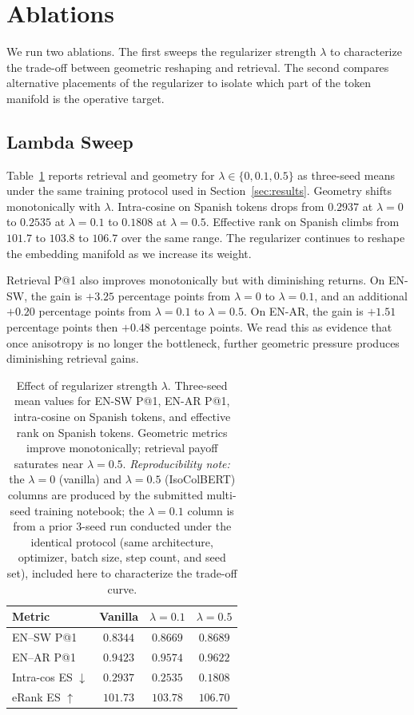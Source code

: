 \section{Ablations}
\label{sec:ablations}

We run two ablations. The first sweeps the regularizer strength $\lambda$ to characterize the trade-off between geometric reshaping and retrieval. The second compares alternative placements of the regularizer to isolate which part of the token manifold is the operative target.

\subsection{Lambda Sweep}
\label{sec:ablations-lambda}

Table~\ref{tab:lambda} reports retrieval and geometry for $\lambda \in \{0, 0.1, 0.5\}$ as three-seed means under the same training protocol used in Section~\ref{sec:results}. Geometry shifts monotonically with $\lambda$. Intra-cosine on Spanish tokens drops from $0.2937$ at $\lambda=0$ to $0.2535$ at $\lambda=0.1$ to $0.1808$ at $\lambda=0.5$. Effective rank on Spanish climbs from $101.7$ to $103.8$ to $106.7$ over the same range. The regularizer continues to reshape the embedding manifold as we increase its weight.

Retrieval P@1 also improves monotonically but with diminishing returns. On EN-SW, the gain is $+3.25$ percentage points from $\lambda=0$ to $\lambda=0.1$, and an additional $+0.20$ percentage points from $\lambda=0.1$ to $\lambda=0.5$. On EN-AR, the gain is $+1.51$ percentage points then $+0.48$ percentage points. We read this as evidence that once anisotropy is no longer the bottleneck, further geometric pressure produces diminishing retrieval gains.

\begin{table}[t]
\centering
\caption{Effect of regularizer strength $\lambda$. Three-seed mean values for EN-SW P@1, EN-AR P@1, intra-cosine on Spanish tokens, and effective rank on Spanish tokens. Geometric metrics improve monotonically; retrieval payoff saturates near $\lambda=0.5$. \textit{Reproducibility note:} the $\lambda=0$ (vanilla) and $\lambda=0.5$ (IsoColBERT) columns are produced by the submitted multi-seed training notebook; the $\lambda=0.1$ column is from a prior 3-seed run conducted under the identical protocol (same architecture, optimizer, batch size, step count, and seed set), included here to characterize the trade-off curve.}
\label{tab:lambda}
\small
\begin{tabular}{lccc}
\toprule
Metric             & Vanilla & $\lambda{=}0.1$ & $\lambda{=}0.5$ \\
\midrule
EN--SW P@1         & $0.8344$ & $0.8669$ & $\mathbf{0.8689}$ \\
EN--AR P@1         & $0.9423$ & $0.9574$ & $\mathbf{0.9622}$ \\
Intra-cos ES $\downarrow$ & $0.2937$ & $0.2535$ & $\mathbf{0.1808}$ \\
eRank ES $\uparrow$       & $101.73$ & $103.78$ & $\mathbf{106.70}$ \\
\bottomrule
\end{tabular}
\end{table}

